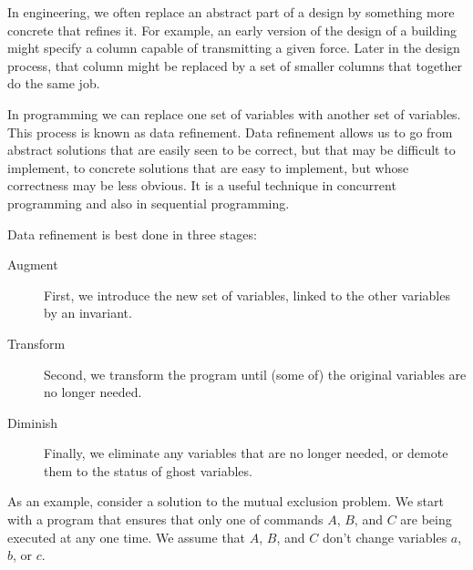 \documentclass[11pt]{article}%
\begin{document}
In engineering, we often replace an abstract part of a design by something
more concrete that refines it. For example, an early version of the design of
a building might specify a column capable of transmitting a given force. Later
in the design process, that column might be replaced by a set of smaller
columns that together do the same job.

In programming we can replace one set of variables with another set of
variables. This process is known as data refinement. Data refinement allows us
to go from abstract solutions that are easily seen to be correct, but that may
be difficult to implement, to concrete solutions that are easy to implement,
but whose correctness may be less obvious. It is a useful technique in
concurrent programming and also in sequential programming.

Data refinement is best done in three stages:

\begin{description}
\item[Augment] First, we introduce the new set of variables, linked to the
other variables by an invariant.

\item[Transform] Second, we transform the program until (some of) the original
variables are no longer needed.

\item[Diminish] Finally, we eliminate any variables that are no longer needed,
or demote them to the status of ghost variables.
\end{description}

As an example, consider a solution to the mutual exclusion problem. We start
with a program that ensures that only one of commands $A$, $B$, and $C$ are
being executed at any one time. We assume that $A$, $B$, and $C$ don't change
variables $a$, $b$, or $c$.
\end{document}
